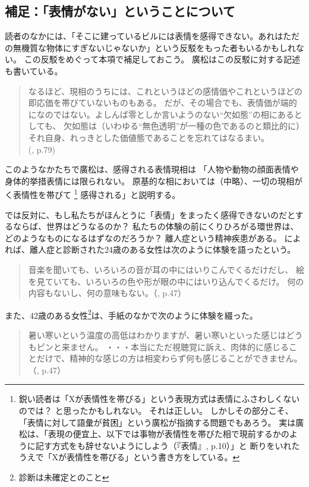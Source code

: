 \subsection{補足：「表情がない」ということについて}

読者のなかには、「そこに建っているビルには表情を感得できない。あれはただの無機質な物体にすぎないじゃないか」という反駁をもった者もいるかもしれない。
この反駁をめぐって本項で補足しておこう。
廣松\cite{hiromatsu:1989}はこの反駁に対する記述も書いている。
\begin{quotation}  
  なるほど、現相のうちには、これというほどの感情価やこれというほどの即応価を帯びていないものもある。
  だが、その場合でも、表情価が端的になのではない。よしんば零としか言いようのない“欠如態”の相にあるとしても、
  欠如態は（いわゆる“無色透明”が一種の色であるのと類比的に）それ自身、れっきとした価値態であることを忘れてはなるまい。\\
  (\cite{hiromatsu:1989}, p.79)
\end{quotation}

このようなかたちで廣松は、感得される表情現相は
「人物や動物の顔面表情や身体的挙措表情には限られない。
原基的な相においては（中略）、一切の現相がく表情性を帯びて
\footnote{鋭い読者は「Xが表情性を帯びる」という表現方式は表情にふさわしくないのでは？
と思ったかもしれない。
それは正しい。
しかしその部分こそ、「表情に対して語彙が貧困」という廣松が指摘する問題でもあろう。
実は廣松は、「表現の便宜上、以下では事物が表情性を帯びた相で現前するかのように記す方式をも辞せないようにしよう（『表情』, p.10）」と
断りをいれたうえで「Xが表情性を帯びる」という書き方をしている。
}
感得される」と説明する。

では反対に、もし私たちがほんとうに「表情」をまったく感得できないのだとするならば、世界はどうなるのか？
私たちの体験の前にくりひろがる環世界は、どのようなものになるはずなのだろうか？
離人症という精神疾患がある。
\cite{nakamura:1979}によれば、離人症と診断された24歳のある女性は次のように体験を語ったという。
\begin{quote}
  音楽を聞いても、いろいろの音が耳の中にはいりこんでくるだけだし、
  絵を見ていても、いろいろの色や形が眼の中にはいり込んでくるだけ。
  何の内容もないし、何の意味もない。（\cite{nakamura:1979}, p.47）
\end{quote}
また、42歳のある女性\footnote{診断は未確定とのこと}は、手紙のなかで次のように体験を綴った。
\begin{quote}
  暑い寒いという温度の高低はわかりますが、暑い寒いといった感じはどうもピンと来ません。
・・・本当にただ視聴覚に訴え、肉体的に感じることだけで、精神的な感じの方は相変わらず何も感じることができません。  
（\cite{nakamura:1979}, p.47）
\end{quote}

